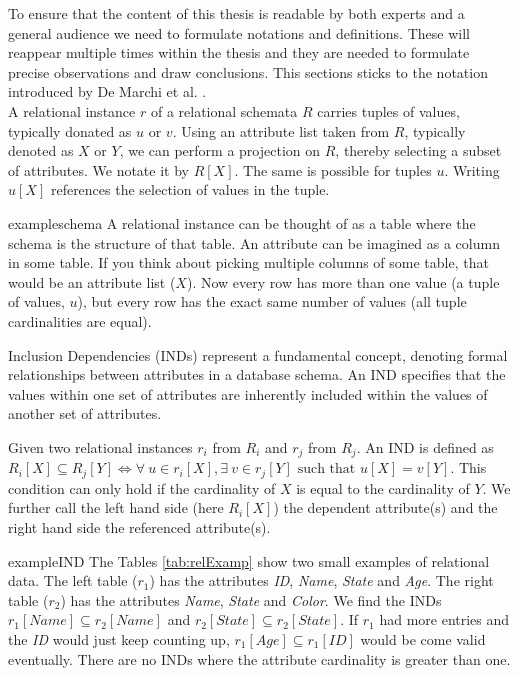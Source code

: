 To ensure that the content of this thesis is readable by both experts and a general audience we need to formulate notations and definitions. These will reappear multiple times within the thesis and they are needed to formulate precise observations and draw conclusions. This sections sticks to the notation introduced by De Marchi et al. \cite{marchi2009unary}. \\

\noindent A relational instance $r$ of a relational schemata $R$ carries tuples of values, typically donated as $u$ or $v$. Using an attribute list taken from $R$, typically denoted as $X$ or $Y$, we can perform a projection on $R$, thereby selecting a subset of attributes. We notate it by $R[X]$. The same is possible for tuples $u$. Writing $u[X]$ references the selection of values in the tuple. \\

\begin{restatable}{example}{schema}\label{exmp:schema}
A relational instance can be thought of as a table where the schema is the structure of that table. An attribute can be imagined as a column in some table. If you think about picking multiple columns of some table, that would be an attribute list ($X$). Now every row has more than one value (a tuple of values, $u$), but every row has the exact same number of values (all tuple cardinalities are equal).
\end{restatable}

\noindent Inclusion Dependencies (INDs) represent a fundamental concept, denoting formal relationships between attributes in a database schema. An IND specifies that the values within one set of attributes are inherently included within the values of another set of attributes.

\begin{definition}\label{def:inds}
    Given two relational instances $r_i$ from $R_i$ and $r_j$ from $R_j$. An IND is defined as $R_i[X] \subseteq R_j[Y] \iff \forall \: u \in r_i[X], \exists \: v \in r_j[Y] \text{ such that } u[X] = v[Y]$. This condition can only hold if the cardinality of $X$ is equal to the cardinality of $Y$. We further call the left hand side (here $R_i[X]$) the dependent attribute(s) and the right hand side the referenced attribute(s).
\end{definition}

\begin{restatable}{example}{IND}\label{exmp:IND}
    The Tables \ref{tab:relExamp} show two small examples of relational data. The left table ($r_1$) has the attributes \textit{ID}, \textit{Name}, \textit{State} and \textit{Age}. The right table ($r_2$) has the attributes \textit{Name}, \textit{State} and \textit{Color}. We find the INDs $r_1[Name] \subseteq r_2[Name]$ and $r_2[State] \subseteq r_2[State]$. If $r_1$ had more entries and the \textit{ID} would just keep counting up, $r_1[Age] \subseteq r_1[ID]$ would be come valid eventually. There are no INDs where the attribute cardinality is greater than one.
\end{restatable}

